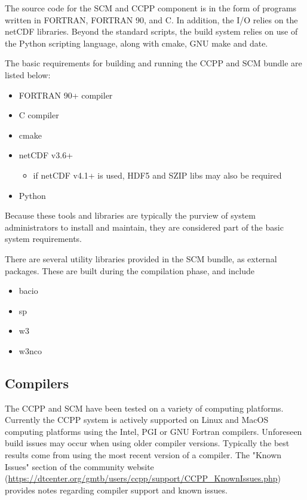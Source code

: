 The source code for the SCM and CCPP component is in the form
of programs written in FORTRAN, FORTRAN 90, and C. In addition, the I/O relies on the netCDF
libraries. Beyond the standard scripts, the build system relies
on use of the Python scripting language, along with cmake, GNU make and date.

The basic requirements for building and running the CCPP and SCM bundle are
listed below:

\begin{itemize}
	\item FORTRAN 90+ compiler
	\item C compiler
	\item cmake 
	\item netCDF v3.6+
        \begin{itemize}
	\item if netCDF v4.1+ is used, HDF5 and SZIP libs may also be required
\end{itemize}
	\item Python
\end{itemize}


Because these tools and libraries are typically the purview of
system administrators to install and maintain, they are considered 
part of the basic system requirements.


There are several utility libraries provided in the SCM bundle, as external packages.  These
are built during the compilation phase, and include


\begin{itemize}
	\item bacio
	\item sp
	\item w3
	\item w3nco
\end{itemize}



\subsection{Compilers}
The CCPP and SCM have been tested on a variety of
computing platforms. Currently the CCPP system is actively supported
on Linux and MacOS computing platforms using the Intel, PGI or GNU Fortran
compilers. Unforeseen build issues may occur when using older
compiler versions. Typically the best results come from using the
most recent version of a compiler. The "Known Issues" section of the
community website (\url{https://dtcenter.org/gmtb/users/ccpp/support/CCPP_KnownIssues.php}) provides notes regarding compiler support and known issues.



